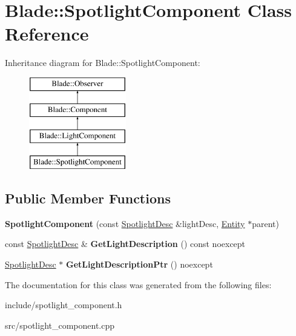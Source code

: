 \hypertarget{class_blade_1_1_spotlight_component}{}\section{Blade\+:\+:Spotlight\+Component Class Reference}
\label{class_blade_1_1_spotlight_component}
Inheritance diagram for Blade\+:\+:Spotlight\+Component\+:\begin{figure}[H]
\begin{center}
\leavevmode
\includegraphics[height=4.000000cm]{class_blade_1_1_spotlight_component}
\end{center}
\end{figure}
\subsection*{Public Member Functions}
\begin{DoxyCompactItemize}
\item 
\mbox{\label{class_blade_1_1_spotlight_component_aa017da6fecc660760842c6af8cc1e400}} 
{\bfseries Spotlight\+Component} (const \hyperlink{struct_blade_1_1_spotlight_desc}{Spotlight\+Desc} \&light\+Desc, \hyperlink{class_blade_1_1_entity}{Entity} $\ast$parent)
\item 
\mbox{\label{class_blade_1_1_spotlight_component_a295a5023723d88d2ec15c459dc34cfd9}} 
const \hyperlink{struct_blade_1_1_spotlight_desc}{Spotlight\+Desc} \& {\bfseries Get\+Light\+Description} () const noexcept
\item 
\mbox{\label{class_blade_1_1_spotlight_component_a8ec9992f153c2356cd498301c8c54563}} 
\hyperlink{struct_blade_1_1_spotlight_desc}{Spotlight\+Desc} $\ast$ {\bfseries Get\+Light\+Description\+Ptr} () noexcept
\end{DoxyCompactItemize}


The documentation for this class was generated from the following files\+:\begin{DoxyCompactItemize}
\item 
include/spotlight\+\_\+component.\+h\item 
src/spotlight\+\_\+component.\+cpp\end{DoxyCompactItemize}
